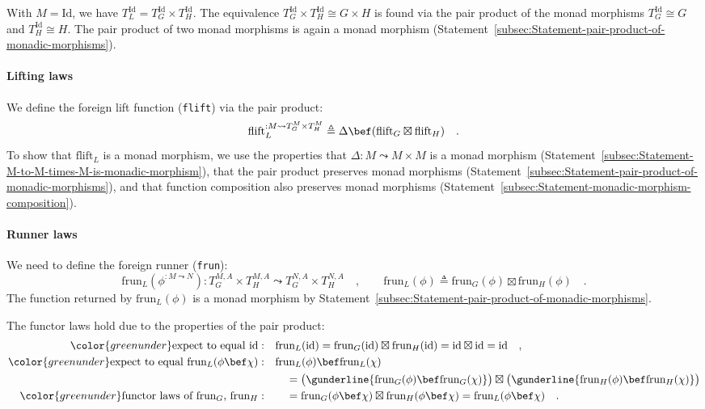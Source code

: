 With $M=\text{Id}$, we have $T_{L}^{\text{Id}}=T_{G}^{\text{Id}}\times T_{H}^{\text{Id}}$.
The equivalence $T_{G}^{\text{Id}}\times T_{H}^{\text{Id}}\cong G\times H$
is found via the pair product of the monad morphisms $T_{G}^{\text{Id}}\cong G$
and $T_{H}^{\text{Id}}\cong H$. The pair product of two monad morphisms
is again a monad morphism (Statement~\ref{subsec:Statement-pair-product-of-monadic-morphisms}).

\paragraph{Lifting laws}

We define the foreign lift function (\lstinline!flift!) via the pair
product:
\[
\text{flift}_{L}^{:M\leadsto T_{G}^{M}\times T_{H}^{M}}\triangleq\Delta\bef(\text{flift}_{G}\boxtimes\text{flift}_{H})\quad.
\]
To show that $\text{flift}_{L}$ is a monad morphism, we use the properties
that $\Delta:M\leadsto M\times M$ is a monad morphism (Statement~\ref{subsec:Statement-M-to-M-times-M-is-monadic-morphism}),
that the pair product preserves monad morphisms (Statement~\ref{subsec:Statement-pair-product-of-monadic-morphisms}),
and that function composition also preserves monad morphisms (Statement~\ref{subsec:Statement-monadic-morphism-composition}).

\paragraph{Runner laws}

We need to define the foreign runner (\lstinline!frun!):
\[
\text{frun}_{L}(\phi^{:M\leadsto N}):T_{G}^{M,A}\times T_{H}^{M,A}\leadsto T_{G}^{N,A}\times T_{H}^{N,A}\quad,\quad\quad\text{frun}_{L}(\phi)\triangleq\text{frun}_{G}(\phi)\boxtimes\text{frun}_{H}(\phi)\quad.
\]
The function returned by $\text{frun}_{L}(\phi)$ is a monad morphism
by Statement~\ref{subsec:Statement-pair-product-of-monadic-morphisms}.

The functor laws hold due to the properties of the pair product:
\begin{align*}
{\color{greenunder}\text{expect to equal }\text{id}:}\quad & \text{frun}_{L}(\text{id})=\text{frun}_{G}(\text{id})\boxtimes\text{frun}_{H}(\text{id})=\text{id}\boxtimes\text{id}=\text{id}\quad,\\
{\color{greenunder}\text{expect to equal }\text{frun}_{L}(\phi\bef\chi):}\quad & \text{frun}_{L}(\phi)\bef\text{frun}_{L}(\chi)\\
 & \quad=\big(\gunderline{\text{frun}_{G}(\phi)\bef\text{frun}_{G}(\chi)}\big)\boxtimes\big(\gunderline{\text{frun}_{H}(\phi)\bef\text{frun}_{H}(\chi)}\big)\\
{\color{greenunder}\text{functor laws of }\text{frun}_{G},\,\text{frun}_{H}:}\quad & \quad=\text{frun}_{G}(\phi\bef\chi)\boxtimes\text{frun}_{H}(\phi\bef\chi)=\text{frun}_{L}(\phi\bef\chi)\quad.
\end{align*}


